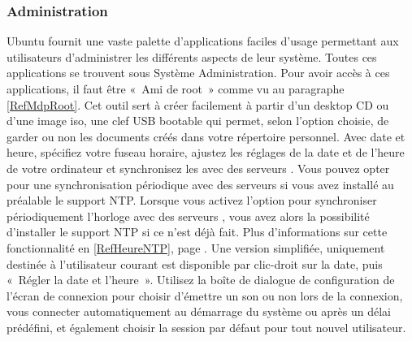 \subsubsection{Administration}
Ubuntu fournit une vaste palette d'applications faciles d'usage permettant aux utilisateurs d'administrer les différents aspects de leur système. Toutes ces applications se trouvent sous Système \FlecheDroite Administration. Pour avoir accès à ces applications, il faut être «~Ami de root~» comme vu au paragraphe \ref{RefMdpRoot}.
Cet outil sert à créer facilement à partir d'un desktop CD ou d'une image iso, une clef USB bootable qui permet, selon l'option choisie, de garder ou non les documents créés dans votre répertoire personnel.
Avec date et heure, spécifiez votre fuseau horaire, ajustez les réglages de la date et de l'heure de votre ordinateur et synchronisez les avec des serveurs . Vous pouvez opter pour une synchronisation périodique avec des serveurs  si vous avez installé au préalable le support NTP. Lorsque vous activez l'option pour synchroniser périodiquement l'horloge avec des serveurs , vous avez alors la possibilité d'installer le support NTP si ce n'est déjà fait. Plus d'informations sur cette fonctionnalité en \ref{RefHeureNTP}, page \pageref{RefHeureNTP}. Une version simplifiée, uniquement destinée à l'utilisateur courant est disponible par clic-droit sur la date, puis «~Régler la date et l'heure~».
Utilisez la boîte de dialogue de configuration de l'écran de connexion pour choisir d'émettre un son ou non lors de la connexion, vous connecter automatiquement au démarrage du système ou après un délai prédéfini, et également choisir la session par défaut pour tout nouvel utilisateur.
